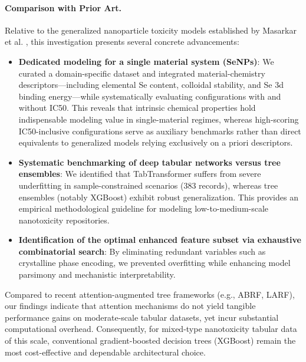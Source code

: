 \paragraph{Comparison with Prior Art.}
Relative to the generalized nanoparticle toxicity models established by Masarkar et al. \cite{masarkar2024}, this investigation presents several concrete advancements:
\begin{itemize}
  \item \textbf{Dedicated modeling for a single material system (SeNPs)}: We curated a domain-specific dataset and integrated material-chemistry descriptors—including elemental Se content, colloidal stability, and Se 3d binding energy—while systematically evaluating configurations with and without IC50. This reveals that intrinsic chemical properties hold indispensable modeling value in single-material regimes, whereas high-scoring IC50-inclusive configurations serve as auxiliary benchmarks rather than direct equivalents to generalized models relying exclusively on a priori descriptors.
  \item \textbf{Systematic benchmarking of deep tabular networks versus tree ensembles}: We identified that TabTransformer suffers from severe underfitting in sample-constrained scenarios (383 records), whereas tree ensembles (notably XGBoost) exhibit robust generalization. This provides an empirical methodological guideline for modeling low-to-medium-scale nanotoxicity repositories.
  \item \textbf{Identification of the optimal enhanced feature subset via exhaustive combinatorial search}: By eliminating redundant variables such as crystalline phase encoding, we prevented overfitting while enhancing model parsimony and mechanistic interpretability.
\end{itemize}
Compared to recent attention-augmented tree frameworks (e.g., ABRF, LARF), our findings indicate that attention mechanisms do not yield tangible performance gains on moderate-scale tabular datasets, yet incur substantial computational overhead. Consequently, for mixed-type nanotoxicity tabular data of this scale, conventional gradient-boosted decision trees (XGBoost) remain the most cost-effective and dependable architectural choice.

